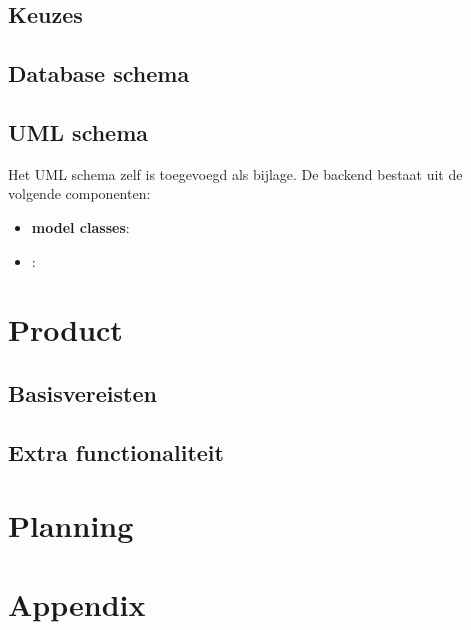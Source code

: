\documentclass[12pt,a4paper]{article}
\begin{document}
\subsection{Keuzes}

\subsection{Database schema}

\subsection{UML schema}

Het UML schema zelf is toegevoegd als bijlage. De backend bestaat uit de volgende componenten:

\begin{itemize}

\item \textbf{model classes}:  

\item \textbf{}:

\end{itemize}

\section{Product}

\subsection{Basisvereisten}

\subsection{Extra functionaliteit}

\section{Planning}

\section{Appendix}
\end{document}
